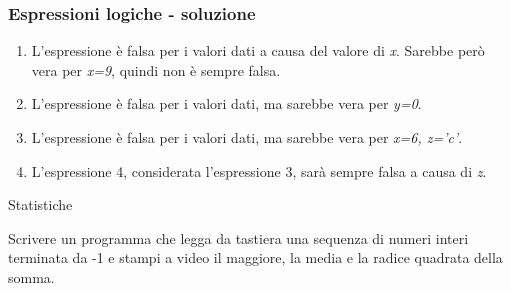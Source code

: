 \documentclass[aspectratio=169, ]{beamer}
\begin{document}
\begin{frame}
    \frametitle{Espressioni logiche - soluzione}
    \begin{enumerate}[<+->]
        \item L'espressione è falsa per i valori dati a causa del valore di \emph{x}. Sarebbe però vera per \emph{x=9}, quindi non è sempre falsa.

        \item L'espressione è falsa per i valori dati, ma sarebbe vera per \emph{y=0}.

        \item L'espressione è falsa per i valori dati, ma sarebbe vera per \emph{x=6, z='c'}.

        \item L'espressione 4, considerata l'espressione 3, sarà sempre falsa a causa di \emph{z}.
    \end{enumerate}
\end{frame}

\begin{frame}{Statistiche}

Scrivere un programma che legga da tastiera una sequenza di numeri interi terminata da -1 e stampi a video il maggiore, la media e la radice quadrata della somma.
\end{frame}
\end{document}
